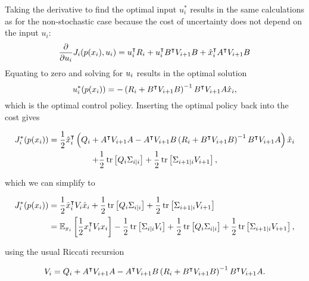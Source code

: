 Taking the derivative to find the optimal input $u_i^*$ results in the same
calculations as for the non-stochastic case because the cost of uncertainty
does not depend on the input $u_i$:
\begin{equation}
  \frac{\partial}{\partial u_i} J_i(p(x_i), u_i) =
    u_i^{\intercal} R_i
  + u_i^{\intercal} B^{\intercal} V_{i+1} B
  + \hat x_i^{\intercal} A^{\intercal} V_{i+1} B
\end{equation}
Equating to zero and solving for $u_i$ results in the optimal solution
\begin{equation}
  \label{eq:sto-dp-policy}
  u_\i^*(p(x_\i)) = -\left(\CC_\i + B\T \VM_{\i+1} B\right)\inv B\T \VM_{\i+1}
  A \hat x_\i,
\end{equation}
which is the optimal control policy. Inserting the optimal policy back into the
cost gives
\begin{fullwidth}\vspace{-\baselineskip}
\begin{multline}
  J^*_i(p(x_i)) =
    \frac{1}{2} \hat x_i^{\intercal} \left(
    Q_i + A^{\intercal} V_{i+1} A
    - A^{\intercal} V_{i+1} B \left(R_i + B^{\intercal} V_{i+1} B\right)^{-1} B^{\intercal} V_{i+1}
A
    \right) \hat x_i \\
  + \frac{1}{2}\operatorname*{tr}\left[ Q_i \Sigma_{i|i} \right]
  + \frac{1}{2}\operatorname*{tr}\left[ \Sigma_{i+1|i} V_{i+1} \right],
\end{multline}
\end{fullwidth}
which we can simplify to
\begin{fullwidth}\vspace{-\baselineskip}
\begin{align}
  J^*_i(p(x_i)) &=
    \frac{1}{2} \hat x_i^{\intercal} V_{i} \hat x_i
  + \frac{1}{2}\operatorname*{tr}\left[ Q_i \Sigma_{i|i} \right]
  + \frac{1}{2}\operatorname*{tr}\left[ \Sigma_{i+1|i} V_{i+1} \right]\\
  &= \mathbb{E}_{x_i} \left[
  \frac{1}{2} x_i^{\intercal} V_{i} x_i \right]
  - \frac{1}{2}\operatorname*{tr}\left[ \Sigma_{i|i} V_{i} \right]
  + \frac{1}{2}\operatorname*{tr}\left[ Q_i \Sigma_{i|i} \right]
  + \frac{1}{2}\operatorname*{tr}\left[ \Sigma_{i+1|i}  V_{i+1} \right],
\end{align}
\end{fullwidth}
using the usual Riccati recursion
\begin{fullwidth}\vspace{-\baselineskip}
\begin{equation}
  V_i = Q_i + A^{\intercal} V_{i+1} A
    - A^{\intercal} V_{i+1} B \left(R_i + B^{\intercal} V_{i+1} B\right)^{-1} B^{\intercal} V_{i+1}
A.
\end{equation}
\end{fullwidth}

